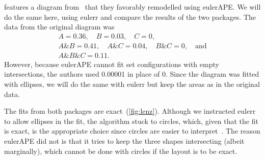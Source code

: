\documentclass[
  oneside,
  openany,
  numbers=noendperiod,
  parskip=half,
  bibliography=totoc
]{scrbook}\usepackage[]{graphicx}\usepackage{xcolor}
\newcommand{\pkg}[1]{{\fontseries{b}\selectfont #1}}
\begin{document}
\citet{Micallef_2014a} features a diagram from~\citet{Lenz_2006} that they
favorably remodelled using \pkg{eulerAPE}. We will do the same here, using \pkg{eulerr} and
compare the results of the two packages. The
data from the original diagram was
\begin{gather*}
A = 0.36,\quad B = 0.03,\quad C = 0,\\
A\&B = 0.41,\quad A\&C = 0.04,\quad B\&C = 0,\quad\text{and}\\
A\&B\&C = 0.11.
\end{gather*}
However, because \pkg{eulerAPE} cannot fit set configurations with empty intersections,
the authors used 0.00001 in place of 0. Since the diagram was fitted with
ellipses, we will do the same with \pkg{eulerr} but keep the
areas as in the original data.

The fits from both packages are exact~(\cref{fig:lenz}). Although
we instructed \pkg{eulerr} to allow ellipses in the fit, the algorithm stuck to
circles, which, given that the fit is exact, is the appropriate choice
since circles are easier to interpret~\citep{Blake_2016}.
The reason \pkg{eulerAPE} did not is that it tries to keep the three
shapes intersecting (albeit marginally), which cannot be done
with circles if the layout is to be exact.
\end{document}
